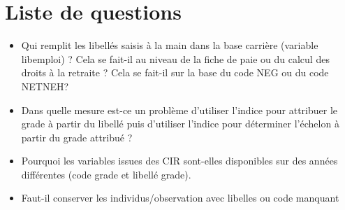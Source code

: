 \documentclass[11pt,a4paper]{article}
\begin{document}
\section*{Liste de questions}

\begin{itemize}[leftmargin=1cm ,parsep=0cm,itemsep=0cm,topsep=0cm] 
\item Qui remplit les libellés saisis à la main dans la base carrière (variable libemploi) ? Cela
se fait-il au niveau de la fiche de paie ou du calcul des droits à la retraite ? Cela se fait-il
sur la base du code NEG ou du code NETNEH?
\item Dans quelle mesure est-ce un problème d'utiliser l'indice pour attribuer le grade à partir
du libellé puis d'utiliser l'indice pour déterminer l'échelon à partir du grade attribué ?
\item Pourquoi les variables issues des CIR sont-elles disponibles sur des années différentes
(code grade et libellé grade).
\item Faut-il conserver les individus/observation avec libelles ou code manquant
\end{itemize}
\end{document}
